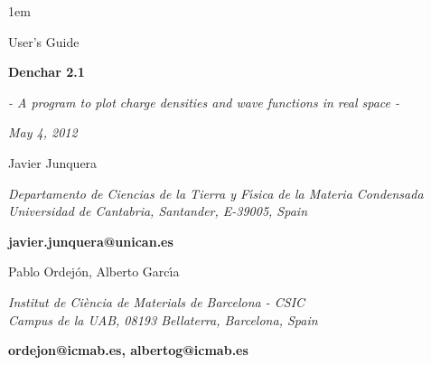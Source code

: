 %
%
%



\textheight 22cm
\textwidth 16cm
\oddsidemargin 1mm
\topmargin -15mm

\baselineskip=14pt
\parskip 5pt
\parindent 1em




\begin{titlepage}

\begin{center}

\vspace{1cm}

{\huge {\sc User's Guide}}

\vspace{4cm}

{\Huge {\bf {\sc Denchar} 2.1} }

\vspace{0.5 cm}

{\Large {\it - A program to plot charge densities and wave functions 
in real space -}}


\vspace{3cm}

{\Large {\it May 4, 2012} }

\vspace{3cm}
{\Large Javier Junquera}

\vspace{5pt}


{\it Departamento de Ciencias de la Tierra y F\'{\i}sica de
     la Materia Condensada \\
     Universidad de Cantabria, Santander, E-39005, Spain}

\vspace{2pt}
{\bf javier.junquera@unican.es }

\vspace{1cm}

{\Large Pablo Ordej\'on, Alberto Garc\'{\i}a}

\vspace{5pt}

{\it Institut de Ci\`encia de Materials de Barcelona - CSIC\\
Campus de la UAB, 08193 Bellaterra, Barcelona, Spain}

\vspace{2pt}
{\bf ordejon@icmab.es, albertog@icmab.es}
\vspace{7mm}
\end{center}

\end{titlepage}

